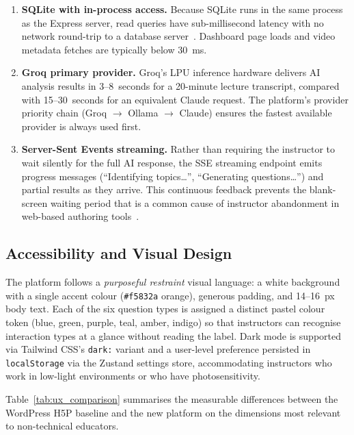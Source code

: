 \begin{enumerate}
  \item \textbf{SQLite with in-process access.} Because SQLite runs in the same
  process as the Express server, read queries have sub-millisecond latency with
  no network round-trip to a database server~\cite{sqlite2023}. Dashboard page
  loads and video metadata fetches are typically below 30~ms.

  \item \textbf{Groq primary provider.} Groq's LPU inference hardware delivers
  AI analysis results in 3--8~seconds for a 20-minute lecture transcript,
  compared with 15--30~seconds for an equivalent Claude request. The
  platform's provider priority chain (Groq $\to$ Ollama $\to$ Claude) ensures
  the fastest available provider is always used first.

  \item \textbf{Server-Sent Events streaming.} Rather than requiring the
  instructor to wait silently for the full AI response, the SSE streaming
  endpoint emits progress messages (``Identifying topics\ldots'',
  ``Generating questions\ldots'') and partial results as they arrive. This
  continuous feedback prevents the blank-screen waiting period that is a common
  cause of instructor abandonment in web-based authoring tools~\cite{davis1989}.
\end{enumerate}

\subsection{Accessibility and Visual Design}

The platform follows a \emph{purposeful restraint} visual language: a white
background with a single accent colour (\texttt{\#f5832a} orange), generous
padding, and 14--16~px body text. Each of the six question types is assigned a
distinct pastel colour token (blue, green, purple, teal, amber, indigo) so
that instructors can recognise interaction types at a glance without reading
the label. Dark mode is supported via Tailwind CSS's \texttt{dark:} variant
and a user-level preference persisted in \texttt{localStorage} via the Zustand
settings store, accommodating instructors who work in low-light environments or
who have photosensitivity.

Table~\ref{tab:ux_comparison} summarises the measurable differences between
the WordPress H5P baseline and the new platform on the dimensions most
relevant to non-technical educators.

